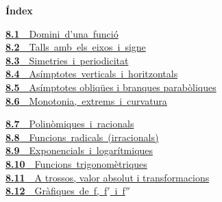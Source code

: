 \documentclass[11pt,a4paper]{article}
\begin{document}
\begin{tcolorbox}[colback=fmsurface,colframe=fmsurface,arc=3mm,left=4mm,right=4mm,top=2mm,bottom=2mm]
\small\textbf{Índex}\par\smallskip
\begin{minipage}[t]{0.49\linewidth}\small \mbox{\hyperlink{sec1}{\textbf{\color{fmgreen}8.1}\ \ Domini d'una funció}}\\[3pt]
\mbox{\hyperlink{sec2}{\textbf{\color{fmgreen}8.2}\ \ Talls amb els eixos i signe}}\\[3pt]
\mbox{\hyperlink{sec3}{\textbf{\color{fmgreen}8.3}\ \ Simetries i periodicitat}}\\[3pt]
\mbox{\hyperlink{sec4}{\textbf{\color{fmgreen}8.4}\ \ Asímptotes verticals i horitzontals}}\\[3pt]
\hyperlink{sec5}{\textbf{\color{fmgreen}8.5}\ \ Asímptotes obliqües i branques parabòliques}\\[3pt]
\mbox{\hyperlink{sec6}{\textbf{\color{fmgreen}8.6}\ \ Monotonia, extrems i curvatura}}\\[3pt]\end{minipage}\hfill\begin{minipage}[t]{0.49\linewidth}\small \mbox{\hyperlink{sec7}{\textbf{\color{fmgreen}8.7}\ \ Polinòmiques i racionals}}\\[3pt]
\mbox{\hyperlink{sec8}{\textbf{\color{fmgreen}8.8}\ \ Funcions radicals (irracionals)}}\\[3pt]
\mbox{\hyperlink{sec9}{\textbf{\color{fmgreen}8.9}\ \ Exponencials i logarítmiques}}\\[3pt]
\mbox{\hyperlink{sec10}{\textbf{\color{fmgreen}8.10}\ \ Funcions trigonomètriques}}\\[3pt]
\hyperlink{sec11}{\textbf{\color{fmgreen}8.11}\ \ A trossos, valor absolut i transformacions}\\[3pt]
\mbox{\hyperlink{sec12}{\textbf{\color{fmgreen}8.12}\ \ Gràfiques de f, f$'$ i f$''$}}\\[3pt]\end{minipage}
\end{tcolorbox}
\vspace*{0.3cm}
\end{document}
